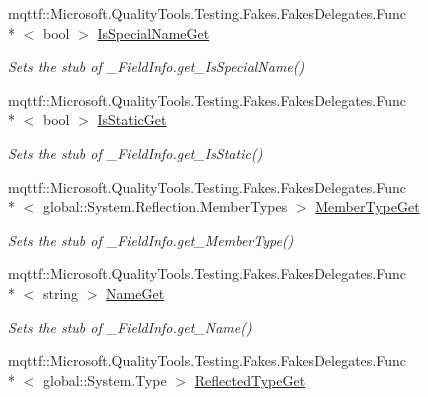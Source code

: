 \begin{DoxyCompactItemize}
mqttf\-::\-Microsoft.\-Quality\-Tools.\-Testing.\-Fakes.\-Fakes\-Delegates.\-Func\\*
$<$ bool $>$ \hyperlink{class_system_1_1_runtime_1_1_interop_services_1_1_fakes_1_1_stub___field_info_a83da2663328e026ada86544f8411cb1b}{Is\-Special\-Name\-Get}
\begin{DoxyCompactList}\small\item\em Sets the stub of \-\_\-\-Field\-Info.\-get\-\_\-\-Is\-Special\-Name()\end{DoxyCompactList}\item 
mqttf\-::\-Microsoft.\-Quality\-Tools.\-Testing.\-Fakes.\-Fakes\-Delegates.\-Func\\*
$<$ bool $>$ \hyperlink{class_system_1_1_runtime_1_1_interop_services_1_1_fakes_1_1_stub___field_info_ab0a9d7776edf145f908572f27ca1fba9}{Is\-Static\-Get}
\begin{DoxyCompactList}\small\item\em Sets the stub of \-\_\-\-Field\-Info.\-get\-\_\-\-Is\-Static()\end{DoxyCompactList}\item 
mqttf\-::\-Microsoft.\-Quality\-Tools.\-Testing.\-Fakes.\-Fakes\-Delegates.\-Func\\*
$<$ global\-::\-System.\-Reflection.\-Member\-Types $>$ \hyperlink{class_system_1_1_runtime_1_1_interop_services_1_1_fakes_1_1_stub___field_info_a5ea3af7322115e58b7fe3a94b14bb314}{Member\-Type\-Get}
\begin{DoxyCompactList}\small\item\em Sets the stub of \-\_\-\-Field\-Info.\-get\-\_\-\-Member\-Type()\end{DoxyCompactList}\item 
mqttf\-::\-Microsoft.\-Quality\-Tools.\-Testing.\-Fakes.\-Fakes\-Delegates.\-Func\\*
$<$ string $>$ \hyperlink{class_system_1_1_runtime_1_1_interop_services_1_1_fakes_1_1_stub___field_info_addf5d89a62b4fe864f187c589e028ffa}{Name\-Get}
\begin{DoxyCompactList}\small\item\em Sets the stub of \-\_\-\-Field\-Info.\-get\-\_\-\-Name()\end{DoxyCompactList}\item 
mqttf\-::\-Microsoft.\-Quality\-Tools.\-Testing.\-Fakes.\-Fakes\-Delegates.\-Func\\*
$<$ global\-::\-System.\-Type $>$ \hyperlink{class_system_1_1_runtime_1_1_interop_services_1_1_fakes_1_1_stub___field_info_a7fbb080abf1cc8588e051e6ed531e4a0}{Reflected\-Type\-Get}

\end{DoxyCompactItemize}
